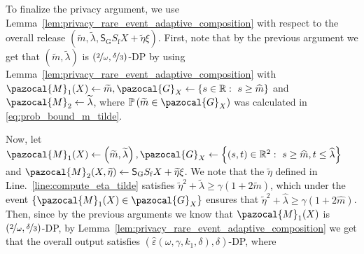 \documentclass[11pt]{article}
\theoremstyle{definition}
\theoremstyle{plain}
\providecommand{\lemmaref}[1]{Lemma~\ref{#1}}
\newcommand{\reals}{\mathbb{R}}
\newcommand{\eps}{{\varepsilon}}
\newcommand{\pG}{\pazocal{G}}
\newcommand{\pM}{\pazocal{M}}
\renewcommand{\eps}{\varepsilon}
\begin{document}
To finalize the privacy argument, we use \lemmaref{lem:privacy_rare_event_adaptive_composition} with respect to the overall release $\left(\widetilde{m}, \widetilde{\lambda}, \mathsf{S}_{\mathrm{G}}S_{\mathrm{f}}X + \widetilde{\eta}\xi\right)$. First, note that by the previous argument we get that $\left(\widetilde{m}, \widetilde{\lambda}\right)$ is $(\nicefrac{2}{\omega}, \nicefrac{\delta}{3})$-DP by using \lemmaref{lem:privacy_rare_event_adaptive_composition} with $\pM_1(X) \gets \widetilde{m}, \pG_X \gets \left\{s\in\reals: \ s\geq \widehat{m}\right\}$ and $\pM_2 \gets \widetilde{\lambda}$, where $\mathbb{P}\left(\widetilde{m} \in \pG_X\right)$ was calculated in \eqref{eq:prob_bound_m_tilde}.  

Now, let $\pM_1(X) \gets \left(\widetilde{m}, \widetilde{\lambda}\right), \pG_{X} \gets \left\{(s,t) \in \reals^{2}: \ s \geq \widehat{m}, t\leq \widehat{\lambda}\right\}$ and $\pM_2(X, \widetilde{\eta}) \gets \mathsf{S}_{\mathrm{G}}S_{\mathrm{f}}X + \widetilde{\eta}\xi$. We note that the $\widetilde{\eta}$ defined in Line.~\ref{line:compute_eta_tilde} satisfies $\widetilde{\eta}^2 + \widetilde{\lambda} \geq \gamma \left(1 + 2\widetilde{m}\right)$, which under the event $\left\{\pM_1(X) \in \pG_{X}\right\}$ ensures that $\widetilde{\eta}^2 + \widehat{\lambda} \geq \gamma \left(1 + 2\widehat{m}\right)$. Then, since by the previous arguments we know that $\pM_1(X)$ is $(\nicefrac{2}{\omega}, \nicefrac{\delta}{3})$-DP, by \lemmaref{lem:privacy_rare_event_adaptive_composition} we get that the overall output satisfies $(\widehat{\eps}(\omega, \gamma, k_1, \delta), \delta)$-DP, where 
\end{document}
